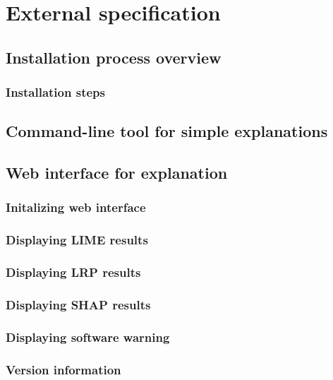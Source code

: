\documentclass[
    bindingoffset=5mm,  %
    footnoteindent=3mm, %
    hyphenation=true    %
]{src/wut-thesis}
\begin{document}
%
%
\clearpage %
\section{External specification} \label{ch:externalSpec}

\subsection{Installation process overview}
\subsubsection{Installation steps}

\subsection{Command-line tool for simple explanations}

\subsection{Web interface for explanation}
\subsubsection{Initalizing web interface}
\subsubsection{Displaying LIME results}
\subsubsection{Displaying LRP results}
\subsubsection{Displaying SHAP results}
\subsubsection{Displaying software warning}
\subsubsection{Version information}

%
%
\clearpage %
\end{document}
